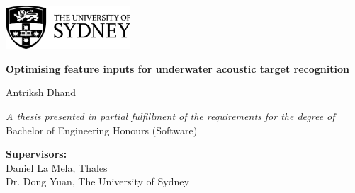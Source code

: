 \begin{titlepage}
    \vspace*{1cm}

    \begin{flushleft}
        \begin{center}
            \includegraphics[width=0.35\textwidth]{img/ch0_frontmatter/usyd_logo_full.png}
    
        \vspace{3cm} 
    
        {\LARGE \textbf{Optimising feature inputs for underwater acoustic target recognition}}
    
        \vspace{1.5cm} 
        
        {\Large Antriksh Dhand} 


        

        \vfill
        
        \textit{A thesis presented in partial fulfillment of the requirements for the degree of\\}
        Bachelor of Engineering Honours (Software)
        
        \vspace{1.75cm}
    
        \textbf{Supervisors:}\\
        Daniel La Mela, Thales\\
        Dr. Dong Yuan, The University of Sydney
    

\end{center}
\end{flushleft}
\end{titlepage}
